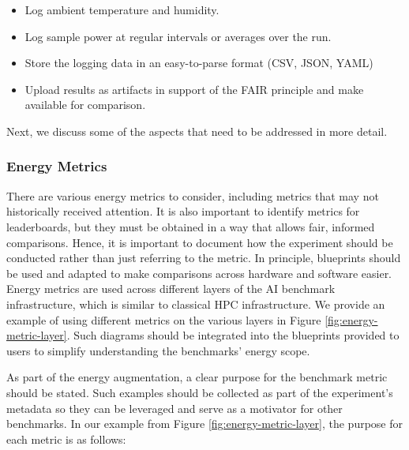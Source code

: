 \begin{itemize}
    \item Log ambient temperature and humidity.
    \item Log sample power at regular intervals or averages over the run.
    \item Store the logging data in an easy-to-parse format (CSV, JSON, YAML) 
    \item Upload results as artifacts in support of the FAIR principle and make available for comparison.
\end{itemize}

Next, we discuss some of the aspects that need to be addressed in more detail.


\subsubsection{Energy Metrics}

There are various energy metrics to consider, including metrics that may not historically received attention. It is also important to identify metrics for leaderboards, but they must be obtained in a way that allows fair, informed comparisons. Hence, it is important to document how the experiment should be conducted rather than just referring to the metric. In principle, blueprints should be used and adapted to make comparisons across hardware and software easier. Energy metrics are used across different layers of the AI benchmark infrastructure, which is similar to classical HPC infrastructure. We provide an example of using different metrics on the various layers in Figure \ref{fig:energy-metric-layer}. Such diagrams should be integrated into the blueprints provided to users to simplify understanding the benchmarks' energy scope.


As part of the energy augmentation, a clear purpose for the benchmark metric should be stated. 
Such examples should be collected as part of the experiment's metadata so they can be leveraged and serve as a motivator for other benchmarks. In our example from Figure \ref {fig:energy-metric-layer}, the purpose for each metric is as follows:



